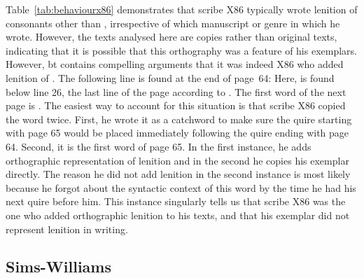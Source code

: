 Table~\ref{tab:behaviourx86} demonstrates that scribe X86 typically wrote lenition of consonants other than , irrespective of which manuscript or genre in which he wrote. However, the texts analysed here are copies rather than original texts, indicating that it is possible that this orthography was a feature of his exemplars. However, \acrshort{bt} contains compelling arguments that it was indeed X86 who added lenition of . The following line is found at the end of page~64:
Here,  is found below line 26, the last line of the page according to \textcite{evans_facsimile_1915}. The first word of the next page is .
The easiest way to account for this situation is that scribe X86  copied the word  twice. First, he wrote it as a catchword to make sure the quire starting with page 65 would be placed immediately following the quire ending with page 64. Second, it  is the first word of page 65. In the first instance, he adds orthographic representation of lenition and in the second he copies his exemplar directly. The reason he did not add lenition in the second instance is most likely because he forgot about the syntactic context of this word by the time he had his next quire before him. This instance singularly tells us that scribe X86 was the one who added orthographic lenition to his texts, and that his exemplar did not represent lenition in writing.


\subsection{Sims-Williams}
\label{sec:sims-williams}


